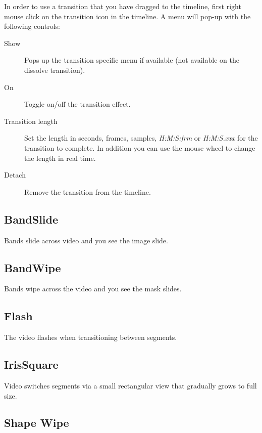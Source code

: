 In order to use a transition that you have dragged to the timeline, first right mouse click on the transition icon in the timeline. A menu will pop-up with the following controls:

\begin{description}
    \item[Show] Pops up the transition specific menu if available (not available on the dissolve transition).
    \item[On] Toggle on/off the transition effect.
    \item[Transition length] Set the length in seconds, frames, samples, \textit{H:M:S:frm} or \textit{H:M:S.xxx} for the transition to complete.  In addition you can use the mouse wheel to change the length in real time.
    \item[Detach] Remove the transition from the timeline.
\end{description}

\subsection*{BandSlide}%
\label{sub:bandslide}

Bands slide across video and you see the image slide.

\subsection*{BandWipe}%
\label{sub:bandwipe}

Bands wipe across the video and you see the mask slides.

\subsection{Flash}%
\label{sub:flash}

The video flashes when transitioning between segments.

\subsection*{IrisSquare}%
\label{sub:irissquare}

Video switches segments via a small rectangular view that gradually grows to full size.

\subsection*{Shape Wipe}%
\label{sub:shape_wipe}

